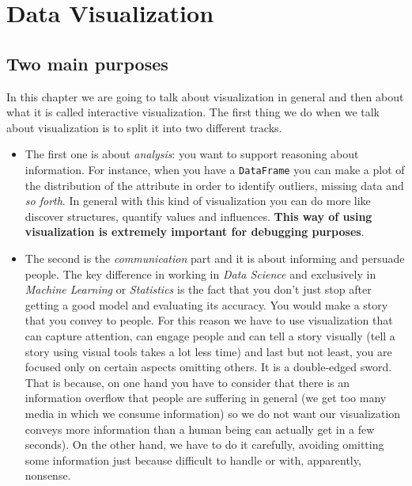 

\section{Data Visualization}
\subsection{Two main purposes}

In this chapter we are going to talk about visualization in general and then about what it is called interactive visualization. The first thing we do when we talk about visualization is to split it into two different tracks. 

\begin{itemize}
\item {The first one is about \emph{analysis}: you want to support reasoning about information. For instance, when you have a \texttt{DataFrame} you can make a plot of the distribution of the attribute in order to identify outliers, missing data and \emph{so forth}. In general with this kind of visualization you can do more like discover structures, quantify values and influences.
\textbf{This way of using visualization is extremely important for debugging purposes}.}

\item{The second  is the \emph{communication} part and it is about informing and persuade people.  The key difference in working in \emph{Data Science} and exclusively in \emph{Machine Learning} or \emph{Statistics} is the fact that you don't just stop after getting a good model and evaluating its accuracy. You would make a story that you convey to people.
For this reason we have to use visualization that can capture attention, can engage people and can tell a story visually (tell a story using visual tools takes a lot less time) and last but not least, you are focused only on certain aspects omitting others. It is a double-edged sword. That is because, on one hand you have to consider that there is an information overflow that people are suffering in general (we get too many media in which we consume information) so we do not want our visualization conveys more information than  a human being can actually get in a few seconds). On the other hand, we have to do it carefully, avoiding omitting some information just because difficult to handle or with, apparently, nonsense.}
\end{itemize}

